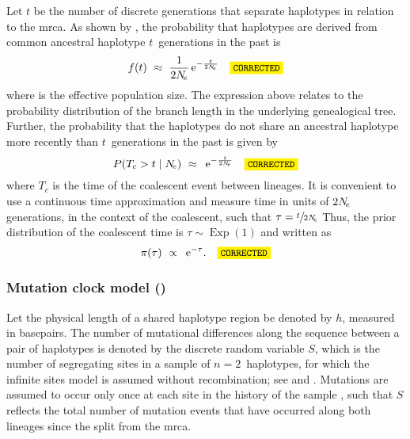 Let $t$ be the number of discrete generations that separate  haplotypes in relation to the \gls{mrca}.
As shown by \citet{Tajima:1983bt}, the probability that  haplotypes are derived from  common ancestral haplotype $t$~generations in the past is
\begin{equation*}
	f(t) ~\approx~ \frac{1}{2\Ne} \euler{-\frac{t}{2\Ne}} \CorrectLabel
\end{equation*}
where \Ne is the effective population size.
The expression above relates to the probability distribution of the branch length in the underlying genealogical tree.
Further, the probability that the  haplotypes do not share an ancestral haplotype more recently than $t$~generations in the past is given by
\begin{equation*}
	P(T_c > t \mid \Ne) ~\approx~ \euler{-\frac{t}{2\Ne}} \CorrectLabel
\end{equation*}
where $T_c$ is the time of the coalescent event between  lineages.
It is convenient to use a continuous time approximation and measure time in units of ${2N_{\!e}}$ generations, in the context of the coalescent, such that ${\tau = \sfrac{t}{2N_{\!e}}}$
Thus, the prior distribution of the coalescent time is ${\tau\sim\operatorname{Exp}(1)}$ and written as
\begin{equation*}
	\pi(\tau) ~\propto~ \euler{-\tau}\text{.}\CorrectLabel
\end{equation*}




%
\subsubsection{Mutation clock model (\ClockM)}\label{sec:mut_clock}
%


Let the physical length of a shared haplotype region be denoted by $h$, measured in basepairs.
The number of mutational differences along the sequence between a pair of haplotypes is denoted by the discrete random variable $S$, which is the number of segregating sites in a sample of ${n=2}$~haplotypes, for which the infinite sites model is assumed without recombination; \eg see \citet{Watterson:1975ur} and \citet{Tavare:1997vra}.
Mutations are assumed to occur only once at each site in the history of the sample \citep{Kimura:1969tn}, such that $S$ reflects the total number of mutation events that have occurred along both lineages since the split from the \gls{mrca}.

